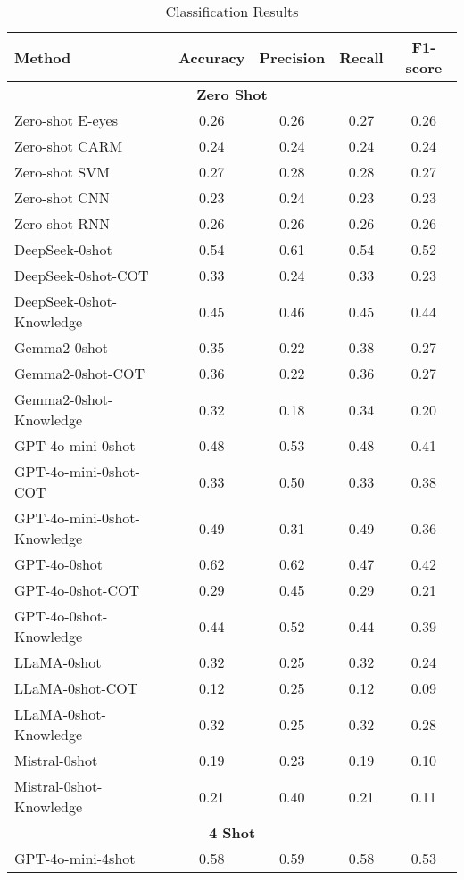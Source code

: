 \begin{table*}[th]
    \centering
    \small
    \caption{Classification Results}
    \begin{tabular}{lcccc}
        \toprule
        \textbf{Method} & \textbf{Accuracy} & \textbf{Precision} & \textbf{Recall} & \textbf{F1-score} \\
        \midrule
        \multicolumn{5}{c}{\textbf{Zero Shot}} \\
                Zero-shot E-eyes & 0.26 & 0.26 & 0.27 & 0.26 \\
        Zero-shot CARM & 0.24 & 0.24 & 0.24 & 0.24 \\
                Zero-shot SVM & 0.27 & 0.28 & 0.28 & 0.27 \\
        Zero-shot CNN & 0.23 & 0.24 & 0.23 & 0.23 \\
        Zero-shot RNN & 0.26 & 0.26 & 0.26 & 0.26 \\
DeepSeek-0shot & 0.54 & 0.61 & 0.54 & 0.52 \\
DeepSeek-0shot-COT & 0.33 & 0.24 & 0.33 & 0.23 \\
DeepSeek-0shot-Knowledge & 0.45 & 0.46 & 0.45 & 0.44 \\
Gemma2-0shot & 0.35 & 0.22 & 0.38 & 0.27 \\
Gemma2-0shot-COT & 0.36 & 0.22 & 0.36 & 0.27 \\
Gemma2-0shot-Knowledge & 0.32 & 0.18 & 0.34 & 0.20 \\
GPT-4o-mini-0shot & 0.48 & 0.53 & 0.48 & 0.41 \\
GPT-4o-mini-0shot-COT & 0.33 & 0.50 & 0.33 & 0.38 \\
GPT-4o-mini-0shot-Knowledge & 0.49 & 0.31 & 0.49 & 0.36 \\
GPT-4o-0shot & 0.62 & 0.62 & 0.47 & 0.42 \\
GPT-4o-0shot-COT & 0.29 & 0.45 & 0.29 & 0.21 \\
GPT-4o-0shot-Knowledge & 0.44 & 0.52 & 0.44 & 0.39 \\
LLaMA-0shot & 0.32 & 0.25 & 0.32 & 0.24 \\
LLaMA-0shot-COT & 0.12 & 0.25 & 0.12 & 0.09 \\
LLaMA-0shot-Knowledge & 0.32 & 0.25 & 0.32 & 0.28 \\
Mistral-0shot & 0.19 & 0.23 & 0.19 & 0.10 \\
Mistral-0shot-Knowledge & 0.21 & 0.40 & 0.21 & 0.11 \\
        \midrule
        \multicolumn{5}{c}{\textbf{4 Shot}} \\
GPT-4o-mini-4shot & 0.58 & 0.59 & 0.58 & 0.53 \\

\end{tabular}
\end{table*}
